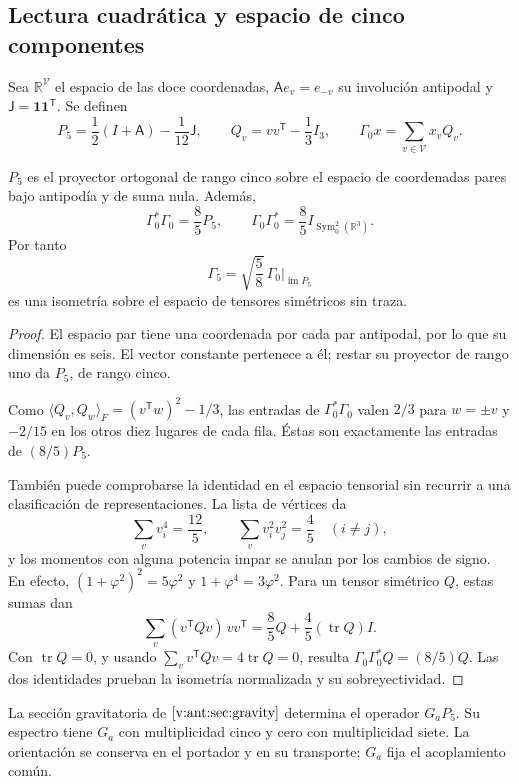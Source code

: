 \subsection{Lectura cuadrática y espacio de cinco componentes}
Sea \(\mathbb R^{\mathcal V}\) el espacio de las doce coordenadas,
\(\mathsf A e_v=e_{-v}\) su involución antipodal y
\(\mathsf J=\mathbf1\mathbf1^{\mathsf T}\). Se definen
\[
 P_5=\frac12(I+\mathsf A)-\frac1{12}\mathsf J,\qquad
 Q_v=vv^{\mathsf T}-\frac13I_3,\qquad
 \Gamma_0x=\sum_{v\in\mathcal V}x_vQ_v.
\]
\begin{theorem}
\label{vii:thm:portador-pentacomponente}
\(P_5\) es el proyector ortogonal de rango cinco sobre el espacio de
coordenadas pares bajo antipodía y de suma nula. Además,
\[
 \Gamma_0^*\Gamma_0=\frac85P_5,\qquad
 \Gamma_0\Gamma_0^*=\frac85I_{\operatorname{Sym}^2_0(\mathbb R^3)}.
\]
Por tanto
\[
 \Gamma_5=\sqrt{\frac58}\,\Gamma_0|_{\operatorname{im}P_5}
\]
es una isometría sobre el espacio de tensores simétricos sin traza.
\end{theorem}
\begin{proof}
El espacio par tiene una coordenada por cada par antipodal, por lo que
su dimensión es seis. El vector constante pertenece a él; restar su
proyector de rango uno da \(P_5\), de rango cinco.

Como
\(\langle Q_v,Q_w\rangle_F=(v^{\mathsf T}w)^2-1/3\), las entradas
de \(\Gamma_0^*\Gamma_0\) valen \(2/3\) para \(w=\pm v\) y
\(-2/15\) en los otros diez lugares de cada fila. Éstas son
exactamente las entradas de \((8/5)P_5\).

También puede comprobarse la identidad en el espacio tensorial sin
recurrir a una clasificación de representaciones. La lista de vértices da
\[
 \sum_vv_i^4=\frac{12}{5},\qquad
 \sum_vv_i^2v_j^2=\frac45\quad(i\ne j),
\]
y los momentos con alguna potencia impar se anulan por los cambios de
signo. En efecto,
\((1+\varphi^2)^2=5\varphi^2\) y \(1+\varphi^4=3\varphi^2\).
Para un tensor simétrico \(Q\), estas sumas dan
\[
 \sum_v(v^{\mathsf T}Qv)\,vv^{\mathsf T}
 =\frac85Q+\frac45(\operatorname{tr}Q)I.
\]
Con \(\operatorname{tr}Q=0\), y usando
\(\sum_vv^{\mathsf T}Qv=4\operatorname{tr}Q=0\), resulta
\(\Gamma_0\Gamma_0^*Q=(8/5)Q\). Las dos identidades prueban
la isometría normalizada y su sobreyectividad.
\end{proof}

La sección gravitatoria de \(\ref{v:ant:sec:gravity}\) determina el
operador \(G_aP_5\). Su espectro tiene \(G_a\) con multiplicidad
cinco y cero con multiplicidad siete. La orientación se conserva en
el portador y en su transporte; \(G_a\) fija el acoplamiento común.

